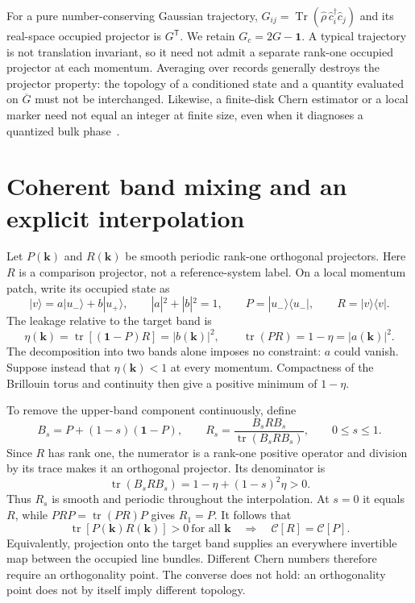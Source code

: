 \documentclass[aps,prb,onecolumn,nofootinbib,superscriptaddress]{revtex4-2}
\newcommand{\id}{\mathbf{1}}
\newcommand{\tr}{\operatorname{tr}}
\newcommand{\Tr}{\operatorname{Tr}}
\newcommand{\bk}{\boldsymbol k}
\newcommand{\C}{\mathcal C}
\begin{document}
For a pure number-conserving Gaussian trajectory, $G_{ij}=\Tr(\hat\rho\,\hat c_i^\dagger\hat c_j)$ and its real-space occupied projector is $G^{\mathsf T}$. We retain $G_c=2G-\id$. A typical trajectory is not translation invariant, so it need not admit a separate rank-one occupied projector at each momentum. Averaging over records generally destroys the projector property: the topology of a conditioned state and a quantity evaluated on $\overline G$ must not be interchanged. Likewise, a finite-disk Chern estimator or a local marker need not equal an integer at finite size, even when it diagnoses a quantized bulk phase~\cite{BiancoResta2011}.

\section{Coherent band mixing and an explicit interpolation}

Let $P(\bk)$ and $R(\bk)$ be smooth periodic rank-one orthogonal projectors. Here $R$ is a comparison projector, not a reference-system label. On a local momentum patch, write its occupied state as
\begin{equation}
 |v\rangle=a|u_-\rangle+b|u_+\rangle,\qquad
 |a|^2+|b|^2=1,\qquad
 P=|u_-\rangle\langle u_-|,\qquad R=|v\rangle\langle v|.
\end{equation}
The leakage relative to the target band is
\begin{equation}
 \eta(\bk)=\tr[(\id-P)R]=|b(\bk)|^2,\qquad
 \tr(PR)=1-\eta=|a(\bk)|^2.
 \label{eq:overlap}
\end{equation}
The decomposition into two bands alone imposes no constraint: $a$ could vanish. Suppose instead that $\eta(\bk)<1$ at every momentum. Compactness of the Brillouin torus and continuity then give a positive minimum of $1-\eta$.

To remove the upper-band component continuously, define
\begin{equation}
 B_s=P+(1-s)(\id-P),\qquad
 R_s=\frac{B_sRB_s}{\tr(B_sRB_s)},\qquad 0\le s\le1.
 \label{eq:overlap-path}
\end{equation}
Since $R$ has rank one, the numerator is a rank-one positive operator and division by its trace makes it an orthogonal projector. Its denominator is
\begin{equation}
 \tr(B_sRB_s)=1-\eta+(1-s)^2\eta>0.
\end{equation}
Thus $R_s$ is smooth and periodic throughout the interpolation. At $s=0$ it equals $R$, while $PRP=\tr(PR)P$ gives $R_1=P$. It follows that
\begin{equation}
 \boxed{\tr[P(\bk)R(\bk)]>0\ \text{for all }\bk
 \quad\Longrightarrow\quad \C[R]=\C[P].}
 \label{eq:overlap-result}
\end{equation}
Equivalently, projection onto the target band supplies an everywhere invertible map between the occupied line bundles. Different Chern numbers therefore require an orthogonality point. The converse does not hold: an orthogonality point does not by itself imply different topology.
\end{document}
